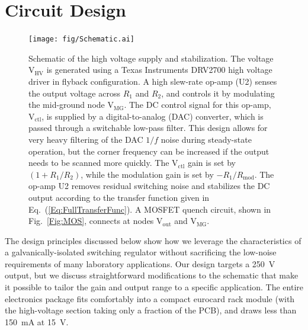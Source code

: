 \documentclass[aip,rsi,reprint]{revtex4-1} %
\begin{document}
\section{Circuit Design}
\label{Sec:Circuit}

\begin{figure}[t]
\texttt{[image: fig/Schematic.ai]}
\caption{Schematic of the high voltage supply and stabilization.
The voltage $\text{V}_\text{HV}$ is generated using a Texas Instruments DRV2700 high voltage driver in flyback configuration.
A high slew-rate op-amp (U2) senses the output voltage across $R_1$ and $R_2$, and controls it by modulating the mid-ground node $\text{V}_\text{MG}$.
The DC control signal for this op-amp,  $\text{V}_{\text{ctl}}$, is supplied by a digital-to-analog (DAC) converter, which is passed through a switchable low-pass filter. 
This design allows for very heavy filtering of the DAC $1/f$ noise during steady-state operation, but the corner frequency can be increased if the output needs to be scanned more quickly.
The $\text{V}_{\text{ctl}}$ gain is set by $\left(1+R_1/R_2\right)$, while the modulation gain is set by $-R_1/R_\text{mod}$.
The op-amp U2 removes residual switching noise and stabilizes the DC output according to the transfer function given in Eq.~(\ref{Eq:FullTransferFunc}).
A MOSFET quench circuit, shown in Fig.~\ref{Fig:MOS}, connects at nodes $\text{V}_\text{out}$ and $\text{V}_\text{MG}$.
\label{Fig:PiezoCircuit}}
\end{figure}


The design principles discussed below show how we leverage the characteristics of a galvanically-isolated switching regulator without sacrificing the low-noise requirements of many laboratory applications.
Our design targets a \SI{250}{\volt} output, but we discuss straightforward modifications to the schematic that make it possible to tailor the gain and output range to a specific application.
The entire electronics package fits comfortably into a compact eurocard rack module (with the high-voltage section taking only a fraction of the PCB), and draws less than \SI{150}{\milli\ampere} at \SI{15}{\volt}.
\end{document}
